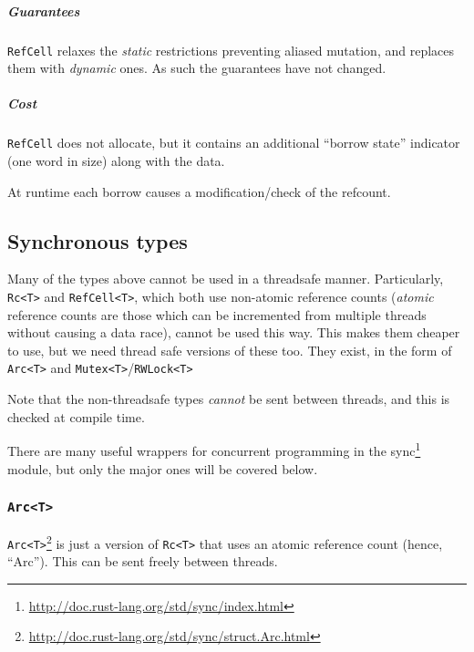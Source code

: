 \documentclass[a4paper,]{book}
\renewcommand{\href}[2]{#2\footnote{\url{#1}}}
\let\oldsubparagraph\subparagraph
\renewcommand{\subparagraph}[1]{\oldsubparagraph{#1}\mbox{}}
\begin{document}
\subparagraph{Guarantees}\label{guarantees-2}

\texttt{RefCell} relaxes the \emph{static} restrictions preventing
aliased mutation, and replaces them with \emph{dynamic} ones. As such
the guarantees have not changed.

\subparagraph{Cost}\label{cost-2}

\texttt{RefCell} does not allocate, but it contains an additional
``borrow state'' indicator (one word in size) along with the data.

At runtime each borrow causes a modification/check of the refcount.

\subsection{Synchronous types}\label{synchronous-types}

Many of the types above cannot be used in a threadsafe manner.
Particularly, \texttt{Rc\textless{}T\textgreater{}} and
\texttt{RefCell\textless{}T\textgreater{}}, which both use non-atomic
reference counts (\emph{atomic} reference counts are those which can be
incremented from multiple threads without causing a data race), cannot
be used this way. This makes them cheaper to use, but we need thread
safe versions of these too. They exist, in the form of
\texttt{Arc\textless{}T\textgreater{}} and
\texttt{Mutex\textless{}T\textgreater{}}/\texttt{RWLock\textless{}T\textgreater{}}

Note that the non-threadsafe types \emph{cannot} be sent between
threads, and this is checked at compile time.

There are many useful wrappers for concurrent programming in the
\href{http://doc.rust-lang.org/std/sync/index.html}{sync} module, but
only the major ones will be covered below.

\subsubsection{\texorpdfstring{\texttt{Arc\textless{}T\textgreater{}}}{Arc\textless{}T\textgreater{}}}\label{arct}

\href{http://doc.rust-lang.org/std/sync/struct.Arc.html}{\texttt{Arc\textless{}T\textgreater{}}}
is just a version of \texttt{Rc\textless{}T\textgreater{}} that uses an
atomic reference count (hence, ``Arc''). This can be sent freely between
threads.
\end{document}
